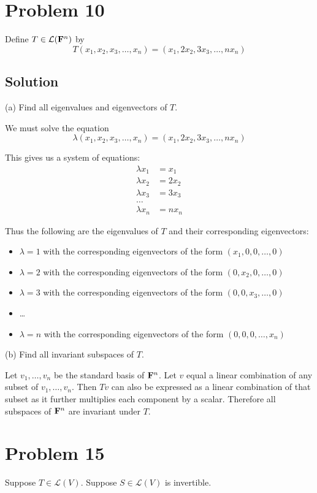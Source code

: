 \documentclass{article}
\begin{document}
\section*{Problem 10}
Define $T\in\mathcal{L}(\mathbf{F}^n)$ by
\[T(x_1,x_2,x_3,\ldots,x_n)=(x_1, 2x_2, 3x_3, \ldots,nx_n)\]

\subsection*{Solution}
(a) Find all eigenvalues and eigenvectors of $T$.

We must solve the equation
\[\lambda(x_1,x_2,x_3,\ldots,x_n)=(x_1, 2x_2, 3x_3, \ldots,nx_n)\]

This gives us a system of equations:
\begin{align*}
    \lambda x_1&=x_1\\
    \lambda x_2&=2x_2\\
    \lambda x_3&=3x_3\\
    \ldots\\
    \lambda x_n&=nx_n
\end{align*}

Thus the following are the eigenvalues of $T$ and their corresponding eigenvectors:
\begin{itemize}
    \item $\lambda=1$ with the corresponding eigenvectors of the form $(x_1,0,0,\ldots,0)$
    \item $\lambda=2$ with the corresponding eigenvectors of the form $(0,x_2,0,\ldots,0)$
    \item $\lambda=3$ with the corresponding eigenvectors of the form $(0,0,x_3,\ldots,0)$
    \item \ldots
    \item $\lambda=n$ with the corresponding eigenvectors of the form $(0,0,0,\ldots,x_n)$
\end{itemize}

(b) Find all invariant subspaces of $T$.

Let $v_1,\ldots,v_n$ be the standard basis of $\mathbf{F}^n$. Let $v$ equal a linear combination of any subset of $v_1,\ldots,v_n$. Then $Tv$ can also be expressed as a linear combination of that subset as it further multiplies each component by a scalar. Therefore all subspaces of $\mathbf{F}^n$ are invariant under $T$.


\newpage
\section*{Problem 15}
Suppose $T\in\mathcal{L}(V)$. Suppose $S\in\mathcal{L}(V)$ is invertible.
\end{document}
